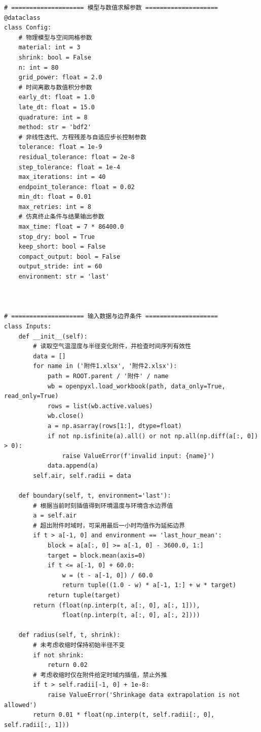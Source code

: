 \begin{Verbatim}[fontsize=\scriptsize,breaklines=true,breakanywhere=true]
# ==================== 模型与数值求解参数 ====================
@dataclass
class Config:
    # 物理模型与空间网格参数
    material: int = 3
    shrink: bool = False
    n: int = 80
    grid_power: float = 2.0
    # 时间离散与数值积分参数
    early_dt: float = 1.0
    late_dt: float = 15.0
    quadrature: int = 8
    method: str = 'bdf2'
    # 非线性迭代、方程残差与自适应步长控制参数
    tolerance: float = 1e-9
    residual_tolerance: float = 2e-8
    step_tolerance: float = 1e-4
    max_iterations: int = 40
    endpoint_tolerance: float = 0.02
    min_dt: float = 0.01
    max_retries: int = 8
    # 仿真终止条件与结果输出参数
    max_time: float = 7 * 86400.0
    stop_dry: bool = True
    keep_short: bool = False
    compact_output: bool = False
    output_stride: int = 60
    environment: str = 'last'



# ==================== 输入数据与边界条件 ====================
class Inputs:
    def __init__(self):
        # 读取空气温湿度与半径变化附件，并检查时间序列有效性
        data = []
        for name in ('附件1.xlsx', '附件2.xlsx'):
            path = ROOT.parent / '附件' / name
            wb = openpyxl.load_workbook(path, data_only=True, read_only=True)
            rows = list(wb.active.values)
            wb.close()
            a = np.asarray(rows[1:], dtype=float)
            if not np.isfinite(a).all() or not np.all(np.diff(a[:, 0]) > 0):
                raise ValueError(f'invalid input: {name}')
            data.append(a)
        self.air, self.radii = data

    def boundary(self, t, environment='last'):
        # 根据当前时刻插值得到环境温度与环境含水边界值
        a = self.air
        # 超出附件时域时，可采用最后一小时均值作为延拓边界
        if t > a[-1, 0] and environment == 'last_hour_mean':
            block = a[a[:, 0] >= a[-1, 0] - 3600.0, 1:]
            target = block.mean(axis=0)
            if t <= a[-1, 0] + 60.0:
                w = (t - a[-1, 0]) / 60.0
                return tuple((1.0 - w) * a[-1, 1:] + w * target)
            return tuple(target)
        return (float(np.interp(t, a[:, 0], a[:, 1])),
                float(np.interp(t, a[:, 0], a[:, 2])))

    def radius(self, t, shrink):
        # 未考虑收缩时保持初始半径不变
        if not shrink:
            return 0.02
        # 考虑收缩时仅在附件给定时域内插值，禁止外推
        if t > self.radii[-1, 0] + 1e-8:
            raise ValueError('Shrinkage data extrapolation is not allowed')
        return 0.01 * float(np.interp(t, self.radii[:, 0], self.radii[:, 1]))




\end{Verbatim}
